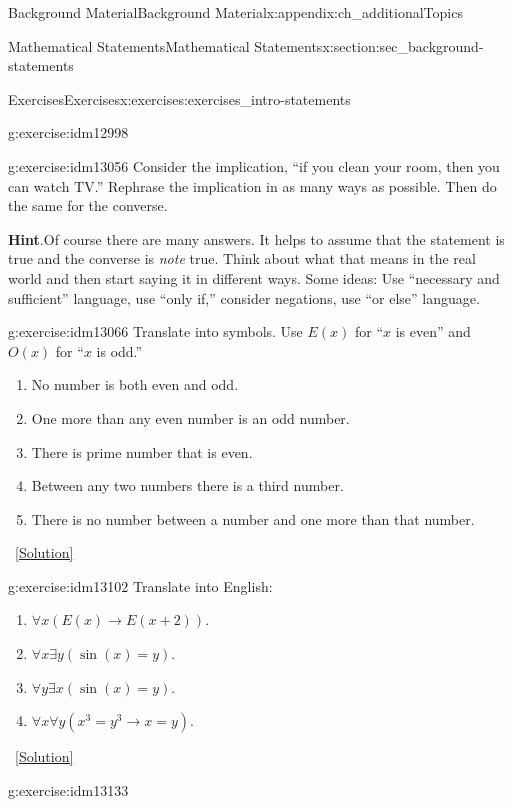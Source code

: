 \documentclass[oneside,10pt,]{book}
\numberwithin{equation}{chapter}
\def\imp{\rightarrow}
\begin{document}
\begin{appendixptx}{Background Material}{}{Background Material}{}{}{x:appendix:ch_additionalTopics}
\begin{sectionptx}{Mathematical Statements}{}{Mathematical Statements}{}{}{x:section:sec_background-statements}
\begin{exercises-subsection}{Exercises}{}{Exercises}{}{}{x:exercises:exercises_intro-statements}
\begin{divisionexercise}{5}{}{}{g:exercise:idm12998}
\begin{enumerate}[label=(\alph*)]
\end{enumerate}
\end{divisionexercise}%
\begin{divisionexercise}{6}{}{}{g:exercise:idm13056}%
Consider the implication, ``if you clean your room, then you can watch TV.'' Rephrase the implication in as many ways as possible. Then do the same for the converse.%
\par\smallskip%
\noindent\textbf{Hint}.\hypertarget{g:hint:idm13060}{}\quad{}Of course there are many answers. It helps to assume that the statement is true and the converse is \emph{note} true. Think about what that means in the real world and then start saying it in different ways. Some ideas: Use ``necessary and sufficient'' language, use ``only if,'' consider negations, use ``or else'' language.%
\end{divisionexercise}%
\begin{divisionexercise}{7}{}{}{g:exercise:idm13066}%
Translate into symbols. Use \(E(x)\) for ``\(x\) is even'' and \(O(x)\) for ``\(x\) is odd.''%
%
\begin{enumerate}[label=(\alph*)]
\item{}No number is both even and odd.%
\item{}One more than any even number is an odd number.%
\item{}There is prime number that is even.%
\item{}Between any two numbers there is a third number.%
\item{}There is no number between a number and one more than that number.%
\end{enumerate}
\qquad~\hfill{\tiny\hyperlink{g:solution:idm13086-main}{[Solution]}}\end{divisionexercise}%
\begin{divisionexercise}{8}{}{}{g:exercise:idm13102}%
Translate into English:%
\begin{enumerate}[label=(\alph*)]
\item{}\(\forall x (E(x) \imp E(x +2))\).%
\item{}\(\forall x \exists y (\sin(x) = y)\).%
\item{}\(\forall y \exists x (\sin(x) = y)\).%
\item{}\(\forall x \forall y (x^3 = y^3 \imp x = y)\).%
\end{enumerate}
%
\qquad~\hfill{\tiny\hyperlink{g:solution:idm13114-main}{[Solution]}}\end{divisionexercise}%
\begin{divisionexercise}{9}{}{}{g:exercise:idm13133}%

\end{divisionexercise}
\end{exercises-subsection}
\end{sectionptx}
\end{appendixptx}
\end{document}
